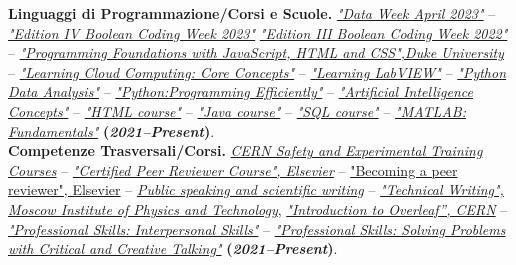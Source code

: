 \documentclass[11pt]{res}
\begin{document}
\begin{resume}
\textbf{Linguaggi di Programmazione/Corsi e Scuole.}
\href{https://drive.google.com/file/d/1XgZ86KM6Vocc-9ZNQSlHN9-ljPsDRRSx/view?usp=share_link}{\textit{"Data Week April 2023"}} -- \href{https://drive.google.com/file/d/1LJg_lcj3g8DCjIHbusRzNlulzKLpmO-D/view?usp=share_link}{\textit{"Edition IV Boolean Coding Week 2023"}} \href{https://drive.google.com/file/d/1x15muyjCytZql1GQQzXSIICASMkJIKWh/view?usp=sharing}{\textit{"Edition III Boolean Coding Week 2022"}} -- \href{https://www.coursera.org/account/accomplishments/certificate/QVDWWH3C8MXV}{\textit{"Programming Foundations with JavaScript, HTML and CSS",Duke University}} -- \href{https://drive.google.com/file/d/1QbnkoML6oBqluVR8ciEqyPicE8jnGo6J/view?usp=sharing}{\textit{"Learning Cloud Computing: Core Concepts"}} -- \href{https://drive.google.com/file/d/1rHMOA8m3MLs0F8_AqIUldhX4vzZbFTGQ/view?%usp=sharing}{\textit{"Learning LabVIEW"}} -- \href{https://drive.google.com/file/d/1FxyFXUghhG-g39umhRG-oX6sN0CRhyAk/view?%usp=sharing}{\textit{"Python Data Analysis"}} -- \href{https://drive.google.com/file/d/1xa-h0UXAjloY4ojJNbiFfJ4nO93Q6wJi/view?%usp=sharing}{\textit{"Python:Programming Efficiently"}} -- \href{https://drive.google.com/file/d/1t3VZrkz1vKlDDB1VhK8Rp0oTFCH86xB1/view}{\textit{"Artificial Intelligence Concepts"}} -- \href{https://www.sololearn.com/Certificate/1014-12467510/pdf/}{\textit{"HTML course"}} -- \href{https://www.sololearn.com/Certificate/1068-12467510/pdf/}{\textit{"Java course"}} -- \href{https://www.sololearn.com/Certificate/1060-12467510/pdf/}{\textit{"SQL course"}} -- \href{https://matlabacademy.mathworks.com/progress/share/certificate.html?id=7a4f829d-5d7d-477e-b477-9ef7dc57bc81}{\textit{"MATLAB: Fundamentals"}} \textbf{(\textit{2021--Present})}.\\

\textbf{Competenze Trasversali/Corsi.}
\href{https://drive.google.com/file/d/1ERwifUWZs0JV1oRLNBSZiIamxv_cBlR8/view?usp=share_link}{\textit{CERN Safety and Experimental Training Courses}} -- \href{https://drive.google.com/file/d/1Rxk1QI1f8aCSJGvztU9PeFWPQlKvzrhy/view?usp=share_link}{\textit{"Certified Peer Reviewer Course", Elsevier}} -- \href{https://drive.google.com/file/d/1AoAw7MSEIjK0C0Jv55N3kFqmMiM2U9lf/view?usp=share_link}{"Becoming a peer reviewer", Elsevier} -- \href{https://drive.google.com/file/d/119ZkpA4OGFroNh0O9Hs60HvjqiKpUPq0/view?usp=sharing}{\textit{Public speaking and scientific writing}} -- \href{https://www.coursera.org/account/accomplishments/certificate/83WJM6X4DY27}{\textit{"Technical Writing", Moscow Institute of Physics and Technology}}, \href{https://drive.google.com/file/d/1to79c-kiCDjbMWiXxkL1zJY3JnbfbXGx/view}{\textit{"Introduction to Overleaf”, CERN}} -- \href{https://drive.google.com/file/d/1t3VZrkz1vKlDDB1VhK8Rp0oTFCH86xB1/view}{\textit{"Professional Skills: Interpersonal Skills"}} --  \href{https://drive.google.com/file/d/1t3VZrkz1vKlDDB1VhK8Rp0oTFCH86xB1/view}{\textit{"Professional Skills: Solving Problems with Critical and Creative Talking"}} \textbf{(\textit{2021--Present})}.\\


\end{resume}
\end{document}
